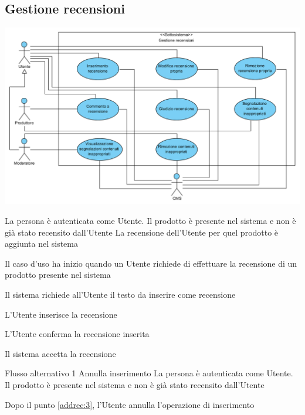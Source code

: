 \subsection{Gestione recensioni}
\begin{center}
   \includegraphics[width=\textwidth]{assets/visualParadigm/GestioneRecensioni}
\end{center}
{}
{La persona è autenticata come Utente. Il prodotto è presente nel sistema e non è già stato recensito dall'Utente}
{La recensione dell'Utente per quel prodotto è aggiunta nel sistema}
{\begin{enumCU}
	\item Il caso d'uso ha inizio quando un Utente richiede di effettuare la recensione di un prodotto presente nel sistema
	\item Il sistema richiede all'Utente il testo da inserire come recensione
	\item L'Utente inserisce la recensione \label{addrec:3}
	\item L'Utente conferma la recensione inserita
	\item Il sistema accetta la recensione
\end{enumCU}}
%
{Flusso alternativo 1}%
{Annulla inserimento}%
{La persona è autenticata come Utente. Il prodotto è presente nel sistema e non è già stato recensito dall'Utente}%
{\postNulle}%
{\begin{enumCU}
		\item Dopo il punto \ref{addrec:3}, l'Utente annulla l'operazione di inserimento
	\end{enumCU}}%

